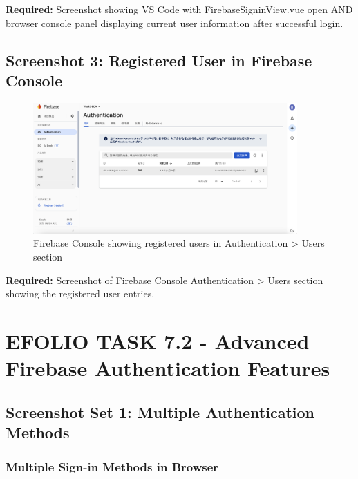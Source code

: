 \documentclass[11pt,a4paper]{article}
\begin{document}
\textbf{Required:} Screenshot showing VS Code with FirebaseSigninView.vue open AND browser console panel displaying current user information after successful login.

\subsection{Screenshot 3: Registered User in Firebase Console}

\begin{figure}[H]
     \centering
     \includegraphics[width=0.9\textwidth]{firebase_registered_user.png}
     \caption{Firebase Console showing registered users in Authentication > Users section}
     \label{fig:firebase_users}
 \end{figure}

\textbf{Required:} Screenshot of Firebase Console Authentication > Users section showing the registered user entries.

\newpage


\section{EFOLIO TASK 7.2 - Advanced Firebase Authentication Features}

\subsection{Screenshot Set 1: Multiple Authentication Methods}

\subsubsection{Multiple Sign-in Methods in Browser}
\end{document}
